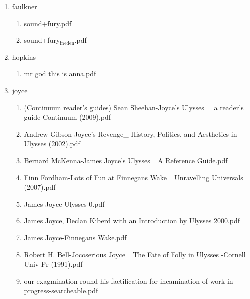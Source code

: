 \documentclass[11pt]{article}
\begin{document}
\begin{enumerate}
\item faulkner
\label{sec-1-1-1-1-28-19}
\begin{enumerate}
\item sound+fury.pdf
\label{sec-1-1-1-1-28-19-1}

\item sound+fury$_{\text{in}}$$_{\text{eden}}$.pdf
\label{sec-1-1-1-1-28-19-2}
\end{enumerate}

\item hopkins
\label{sec-1-1-1-1-28-20}
\begin{enumerate}
\item mr god this is anna.pdf
\label{sec-1-1-1-1-28-20-1}
\end{enumerate}

\item joyce
\label{sec-1-1-1-1-28-21}
\begin{enumerate}
\item (Continuum reader's guides) Sean Sheehan-Joyce's Ulysses \_ a reader's guide-Continuum (2009).pdf
\label{sec-1-1-1-1-28-21-1}

\item Andrew Gibson-Joyce's Revenge\_ History, Politics, and Aesthetics in Ulysses (2002).pdf
\label{sec-1-1-1-1-28-21-2}

\item Bernard McKenna-James Joyce's Ulysses\_ A Reference Guide.pdf
\label{sec-1-1-1-1-28-21-3}

\item Finn Fordham-Lots of Fun at Finnegans Wake\_ Unravelling Universals (2007).pdf
\label{sec-1-1-1-1-28-21-4}

\item James Joyce Ulysses  0.pdf
\label{sec-1-1-1-1-28-21-5}

\item James Joyce, Declan Kiberd with an Introduction by Ulysses  2000.pdf
\label{sec-1-1-1-1-28-21-6}

\item James Joyce-Finnegans Wake.pdf
\label{sec-1-1-1-1-28-21-7}

\item Robert H. Bell-Jocoserious Joyce\_ The Fate of Folly in Ulysses  -Cornell Univ Pr (1991).pdf
\label{sec-1-1-1-1-28-21-8}

\item our-exagmination-round-his-factification-for-incamination-of-work-in-progress-searcheable.pdf
\label{sec-1-1-1-1-28-21-9}
\end{enumerate}


\end{enumerate}
\end{document}

